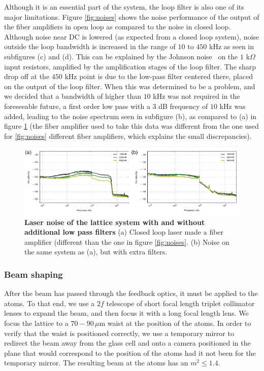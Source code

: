 \documentclass[twocolumn,aps,pra,showpacs,preprintnumbers,bibnotes]{revtex4-1}
\begin{document}
Although it is an essential part of the system, the loop filter is also one of its major limitations. Figure \ref{fig:noises} shows the noise performance of the output of the fiber amplifiers in open loop as compared to the noise in closed loop. Although noise near DC is lowered (as expected from a closed loop system), noise outside the loop bandwidth is increased in the range of $10$ to $450$ kHz as seen in subfigures (c) and (d).
This can be explained by the Johnson noise~\cite{Horowitz2015} on the $1$ k$\Omega$ input resistors, amplified by the amplification stages of the loop filter.
The sharp drop off at the $450$ kHz point is due to the low-pass filter centered there, placed on the output of the loop filter.
When this was determined to be a problem, and we decided that a bandwidth of higher than $10$ kHz was not required in the foreseeable future, a first order low pass with a $3$ dB frequency of $10$ kHz was  added, leading to the noise spectrum seen in subfigure (b), as compared to (a) in figure \ref{fig:low_pass_noises} (the fiber amplifier used to take this data was different from the one used for \ref{fig:noises} different fiber amplifiers, which explains the small discrepancies). 

\begin{figure}
  \begin{center}
    \includegraphics{fig/low_pass_filters.pdf}
    \caption{\textbf{Laser noise of the lattice system with and without additional low pass filters} (a) Closed loop laser made a fiber amplifier (different than the one in figure \ref{fig:noises}. (b) Noise on the same system as (a), but with extra filters.}\label{fig:low_pass_noises}
  \end{center}
\end{figure}


\subsubsection{Beam shaping}
After the beam has passed through the feedback optics, it must be applied to the atoms. To that end, we use a $2f$ telescope of short focal length triplet collimator lenses to expand the beam, and then focus it with a long focal length lens.
We focus the lattice to a $70-90$\,$\mu$m waist at the position of the atoms.
In order to verify that the waist is positioned correctly, we use a temporary mirror to redirect the beam away from the glass cell and onto a camera positioned in the plane that would correspond to the position of the atoms had it not been for the temporary mirror.
The resulting beam at the atoms has an $m^2\leq1.4$.
\end{document}
